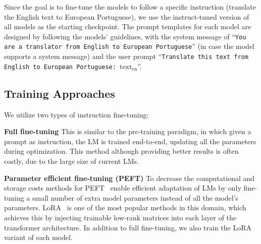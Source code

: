 Since the goal is to fine-tune the models to follow a specific instruction (translate the English text to European Portuguese), we use the instruct-tuned version of all models as the starting checkpoint. 
The prompt templates for each model are designed by following the models' guidelines, with the system message of ``\texttt{You are a translator from English to European Portuguese}''  (in case the model supports a system message) and the user prompt ``\texttt{Translate this text from English to European Portuguese: \textit{\( \text{text}_\text{en} \)}}''.

\subsection{Training Approaches}

We utilize two types of instruction fine-tuning:

\textbf{Full fine-tuning} This is similar to the pre-training paradigm, in which given a prompt as instruction, the LM is trained end-to-end, updating all the parameters during optimization. This method although providing better results is often costly, due to the large size of current LMs.

\textbf{Parameter efficient fine-tuning (PEFT)} To decrease the computational and storage costs methods for PEFT~\cite{Xu2023} enable efficient adaptation of LMs by only fine-tuning a small number of extra model parameters instead of all the model's parameters. LoRA~\cite{Hu2022,Xu2024} is one of the most popular methods in this domain, which achieves this by injecting trainable low-rank matrices into each layer of the transformer architecture. In addition to full fine-tuning, we also train the LoRA variant of each model.